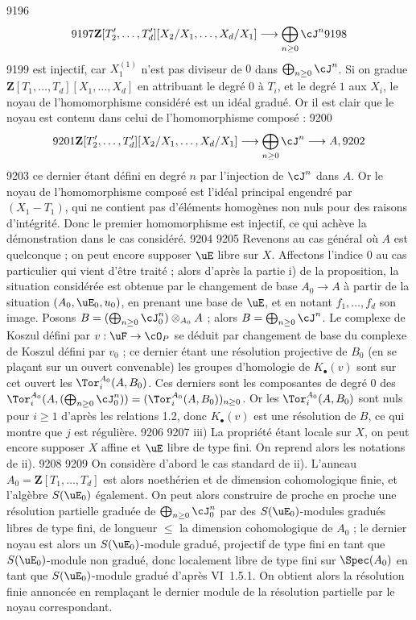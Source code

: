   9196	\[
  9197	\mathbf{Z}[T'_2,\dots,T'_d][X_2/X_1,\dots,X_d/X_1] \longrightarrow \bigoplus_{n \geq 0} \cJ^n
  9198	\]
  9199	est injectif, car $X_1^{(1)}$ n'est pas diviseur de $0$ dans $\bigoplus_{n \geq 0} \cJ^n$. Si on gradue $\mathbf{Z}[T_1,\dots,T_d][X_1,\dots,X_d]$ en attribuant le degr\'e $0$ \`a $T_i$, et le degr\'e $1$ aux $X_i$, le noyau de l'homomorphisme consid\'er\'e est un id\'eal gradu\'e. Or il est clair que le noyau est contenu dans celui de l'homomorphisme compos\'e :
  9200	\[
  9201	\mathbf{Z}[T'_2,\dots,T'_d][X_2/X_1,\dots,X_d/X_1] \longrightarrow \bigoplus_{n \geq 0} \cJ^n \longrightarrow A,
  9202	\]
  9203	ce dernier \'etant d\'efini en degr\'e $n$ par l'injection de $\cJ^n$ dans $A$. Or le noyau de l'homomorphisme compos\'e est l'id\'eal principal engendr\'e par $(X_1 - T_1)$, qui ne contient pas d'\'el\'ements homog\`enes non nuls pour des raisons d'int\'egrit\'e. Donc le premier homomorphisme est injectif, ce qui ach\`eve la d\'emonstration dans le cas consid\'er\'e.
  9204	
  9205	Revenons au cas g\'en\'eral o\`u $A$ est quelconque ; on peut encore supposer $\uE$ libre sur $X$. Affectons l'indice $0$ au cas particulier qui vient d'\^etre trait\'e ; alors d'apr\`es la partie i) de la proposition, la situation consid\'er\'ee est obtenue par le changement de base $A_0 \to A$ \`a partir de la situation $(A_0, \uE_0, u_0)$, en prenant une base de $\uE$, et en notant $f_1,\dots,f_d$ son image. Posons $B = (\bigoplus_{n \geq 0} \cJ_0^n) \otimes_{A_0} A$ ; alors $B = \bigoplus_{n \geq 0} \cJ^n$. Le complexe de Koszul d\'efini par $v: \uF \to \cO_P$ se d\'eduit par changement de base du complexe de Koszul d\'efini par $v_0$ ; ce dernier \'etant une r\'esolution projective de $B_0$ (en se pla\c{c}ant sur un ouvert convenable) les groupes d'homologie de $K_{\bullet}(v)$ sont sur cet ouvert les $\Tor_i^{A_0}(A, B_0)$. Ces derniers sont les composantes de degr\'e $0$ des $\Tor_i^{A_0}(A, (\bigoplus_{n \geq 0} \cJ_0^n)) = (\Tor_i^{A_0}(A, B_0))_{n \geq 0}$. Or les $\Tor_i^{A_0}(A, B_0)$ sont nuls pour $i \geq 1$ d'apr\`es les relations 1.2, donc $K_{\bullet}(v)$ est une r\'esolution de $B$, ce qui montre que $j$ est r\'eguli\`ere.
  9206	
  9207	iii) La propri\'et\'e \'etant locale sur $X$, on peut encore supposer $X$ affine et $\uE$ libre de type fini. On reprend alors les notations de ii).
  9208	
  9209	On consid\`ere d'abord le cas standard de ii). L'anneau $A_0 = \mathbf{Z}[T_1,\dots,T_d]$ est alors noeth\'erien et de dimension cohomologique finie, et l'alg\`ebre $S(\uE_0)$ \'egalement. On peut alors construire de proche en proche une r\'esolution partielle gradu\'ee de $\bigoplus_{n \geq 0} \cJ_0^n$ par des $S(\uE_0)$-modules gradu\'es libres de type fini, de longueur $\leq$ la dimension cohomologique de $A_0$ ; le dernier noyau est alors un $S(\uE_0)$-module gradu\'e, projectif de type fini en tant que $S(\uE_0)$-module non gradu\'e, donc localement libre de type fini sur $\Spec(A_0)$ en tant que $S(\uE_0)$-module gradu\'e d'apr\`es VI~1.5.1. On obtient alors la r\'esolution finie annonc\'ee en rempla\c{c}ant le dernier module de la r\'esolution partielle par le noyau correspondant.
